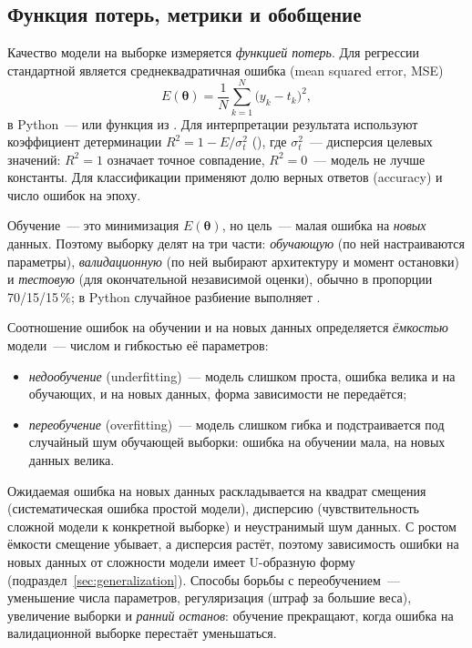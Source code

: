 \subsection{Функция потерь, метрики и обобщение}

Качество модели на выборке измеряется \emph{функцией потерь}. Для регрессии стандартной является
среднеквадратичная ошибка (mean squared error, MSE)
\begin{equation}
\label{eq:mse}
E(\boldsymbol\theta) = \frac{1}{N}\sum_{k=1}^{N} \bigl(y_k - t_k\bigr)^2 ,
\end{equation}
в Python~---  или функция  из . Для
интерпретации результата используют коэффициент детерминации $R^2 = 1 - E / \sigma_t^2$
(), где
$\sigma_t^2$~--- дисперсия целевых значений: $R^2 = 1$ означает точное совпадение, $R^2 = 0$~---
модель не лучше константы. Для классификации применяют долю верных ответов (accuracy) и число
ошибок на эпоху.

Обучение~--- это минимизация $E(\boldsymbol\theta)$, но цель~--- малая ошибка на \emph{новых} данных.
Поэтому выборку делят на три части: \emph{обучающую} (по ней настраиваются параметры),
\emph{валидационную} (по ней выбирают архитектуру и момент остановки) и \emph{тестовую} (для
окончательной независимой оценки), обычно в пропорции 70/15/15\,\%; в Python случайное разбиение
выполняет .

Соотношение ошибок на обучении и на новых данных определяется \emph{ёмкостью} модели~--- числом и
гибкостью её параметров:
\begin{itemize}
\item \emph{недообучение} (underfitting)~--- модель слишком проста, ошибка велика и на обучающих, и на
новых данных, форма зависимости не передаётся;
\item \emph{переобучение} (overfitting)~--- модель слишком гибка и подстраивается под случайный шум
обучающей выборки: ошибка на обучении мала, на новых данных велика.
\end{itemize}
Ожидаемая ошибка на новых данных раскладывается на квадрат смещения (систематическая ошибка простой
модели), дисперсию (чувствительность сложной модели к конкретной выборке) и неустранимый шум данных.
С ростом ёмкости смещение убывает, а дисперсия растёт, поэтому зависимость ошибки на новых данных от
сложности модели имеет U-образную форму (подраздел~\ref{sec:generalization}). Способы борьбы с переобучением~--- уменьшение числа параметров,
регуляризация (штраф за большие веса), увеличение выборки и \emph{ранний останов}: обучение
прекращают, когда ошибка на валидационной выборке перестаёт уменьшаться.

